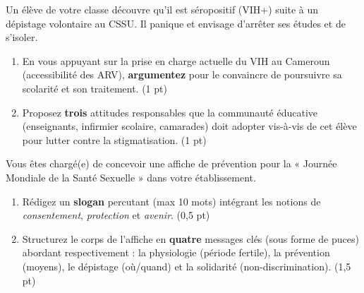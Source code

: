 \documentclass[11pt]{article}
\begin{document}
\begin{exercice}
Un élève de votre classe découvre qu'il est séropositif (VIH+) suite à un dépistage volontaire au CSSU. Il panique et envisage d'arrêter ses études et de s'isoler.
\begin{enumerate}
    \item En vous appuyant sur la prise en charge actuelle du VIH au Cameroun (accessibilité des ARV), \textbf{argumentez} pour le convaincre de poursuivre sa scolarité et son traitement. (1 pt)
    \item Proposez \textbf{trois} attitudes responsables que la communauté éducative (enseignants, infirmier scolaire, camarades) doit adopter vis-à-vis de cet élève pour lutter contre la stigmatisation. (1 pt)
\end{enumerate}
\end{exercice}

\begin{exercice}
Vous êtes chargé(e) de concevoir une affiche de prévention pour la « Journée Mondiale de la Santé Sexuelle » dans votre établissement.
\begin{enumerate}
    \item Rédigez un \textbf{slogan} percutant (max 10 mots) intégrant les notions de \textit{consentement}, \textit{protection} et \textit{avenir}. (0,5 pt)
    \item Structurez le corps de l'affiche en \textbf{quatre} messages clés (sous forme de puces) abordant respectivement : la physiologie (période fertile), la prévention (moyens), le dépistage (où/quand) et la solidarité (non-discrimination). (1,5 pt)
\end{enumerate}
\end{exercice}
\end{document}
